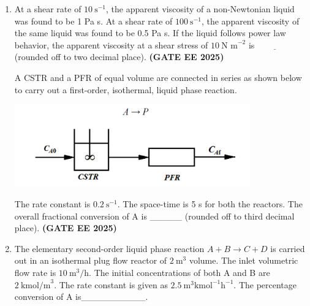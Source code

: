 \documentclass[journal,12pt,onecolumn]{IEEEtran}
\theoremstyle{remark}
\begin{document}
\begin{enumerate}
\item At a shear rate of $10~\text{s}^{-1}$, the apparent viscosity of a non-Newtonian liquid was found to be 1 Pa s. At a shear rate of $100~\text{s}^{-1}$, the apparent viscosity of the same liquid was found to be 0.5 Pa s. If the liquid follows power law behavior, the apparent viscosity  at a shear stress of $10~\text{N m}^{-2}$ is$\underline{\hspace{2cm}}$(rounded off to two decimal place). \hfill \textbf{(GATE EE 2025)} 



 A CSTR and a PFR of equal volume are connected in series as shown below to carry out a first-order, isothermal, liquid phase reaction.
\begin{center}
\includegraphics[width=0.8\textwidth]{figs/39.png}
\end{center}
The rate constant is $0.2~\text{s}^{-1}$. The space-time is 5 s for both the reactors. The overall fractional conversion of A is \_\_\_\_\_ (rounded off to third decimal place). \hfill \textbf{(GATE EE 2025)} 



\item  The elementary second-order liquid phase reaction $A+B\rightarrow C+D$ is carried out in an isothermal plug flow reactor of $2~\text{m}^{3}$ volume. The inlet volumetric flow rate is $10~\text{m}^{3}/\text{h}$. The initial concentrations of both A and B are $2~\text{kmol/m}^{3}$. The rate constant is given as $2.5~\text{m}^{3} \text{kmol}^{-1} \text{h}^{-1}$. The percentage conversion of A is\_\_\_\_\_\_\_\_\_\_.





\end{enumerate}
\end{document}
